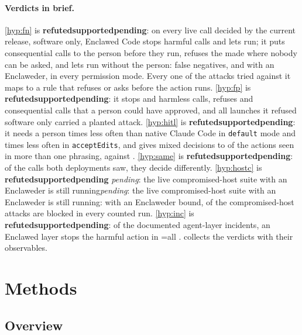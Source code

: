 \documentclass[11pt]{article}
\makeatletter
\newcommand{\sys}{Enclawed}
\newcommand{\dev}{Enclaweder}
\newcommand{\cz}{Enclawed Code}
\newcommand{\pending}{\textcolor{red!60!black}{\textit{pending}}}
\newcommand{\pendingfinal}{\pending}
\newcommand{\cz@pendA}{\pendingfinal{}}
\newcommand{\cz@pendB}{\pending{}}
\newcommand{\czIfPending}[3]{\ifx#1\cz@pendA#2\else\ifx#1\cz@pendB#2\else#3\fi\fi}
\newcommand{\czVerdict}[1]{\textbf{\ifcase#1 refuted\or supported\or pending\fi}}
\newcommand{\VerdictHone}{\czVerdict{\HoneCode}}
\newcommand{\VerdictHtwo}{\czVerdict{\HtwoCode}}
\newcommand{\VerdictHthree}{\czVerdict{\HthreeCode}}
\newcommand{\VerdictHfour}{\czVerdict{\HfourCode}}
\newcommand{\VerdictHfive}{\czVerdict{\HfiveCode}}
\newcommand{\VerdictHsix}{\czVerdict{\HsixCode}}
\makeatother
\begin{document}
\paragraph{Verdicts in brief.} \ref{hyp:fn} is \VerdictHone{}: on every
live call decided by the current release, software only, \cz{} stops
\OutCzOneHarmfulStopped{} harmful calls and lets \CzOneFNHarmful{} run;
it puts \OutCzOneConsequentialAskWithPerson{} consequential calls to the
person before they run, refuses the \OutCzOneConsequentialRefusedNoPerson{}
made where nobody can be asked, and lets \CzOneFNConsequential{} run
without the person: \CzOneFN{} false negatives, and \CzTwoFN{} with an
\dev{}, in every permission mode. Every one of the \AttacksTotal{} attacks tried against
it maps to a rule that refuses or asks before the action runs.
\ref{hyp:fp} is \VerdictHtwo{}: it stops \CzOneFPHarmless{} and
\CzTwoFPHarmless{} harmless calls, refuses \CzOneFPConsequential{} and
\CzTwoFPConsequential{} consequential calls that a person could have
approved, and all \LaunchCOneRefused{} launches it refused software only
carried a planted attack. \ref{hyp:hitl} is \VerdictHthree{}: it needs a person
\CzOneHitlFactorDefault{} times less often than native Claude Code in
\texttt{default} mode and \CzOneHitlFactorAcceptEdits{} times less often
in \texttt{acceptEdits}, and gives mixed decisions to
\SameCzOneMixedShare{} of the actions seen in more than one phrasing,
against \SameNativeMixedShare{}. \ref{hyp:same} is \VerdictHfour{}: of the
\SharedCalls{} calls both deployments saw, they decide
\SharedCallsDiffer{} differently. \ref{hyp:hostc} is \VerdictHfive{}%
\czIfPending{\HostcDevBlocked}{: the live compromised-host suite with an
\dev{} is still running}{: with an \dev{} bound, \HostcDevBlocked{} of
the \HostcAttacks{} compromised-host attacks are blocked in every counted
run}. \ref{hyp:inc} is \VerdictHsix{}: of the \IncLayerTotal{}
documented agent-layer incidents, an \sys{} layer stops the harmful
action in \ifnum\IncStopped=\IncLayerTotal\relax all \fi\IncStopped{}.  collects the verdicts with
their observables.

\section{Methods}
\label{sec:methods}

\subsection{Overview}
\label{sec:overview}
\end{document}
